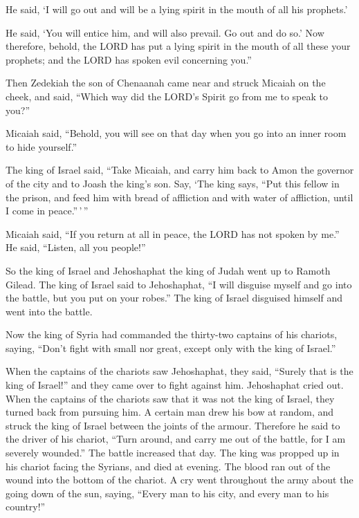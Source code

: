 He said, `I will go out and will be a lying spirit in the mouth of all
his prophets.'

He said, `You will entice him, and will also prevail. Go out and do so.'
 Now therefore, behold, the LORD has put a lying spirit in
the mouth of all these your prophets; and the LORD has spoken evil
concerning you.''

 Then Zedekiah the son of Chenaanah came near and struck
Micaiah on the cheek, and said, ``Which way did the LORD's Spirit go
from me to speak to you?''

 Micaiah said, ``Behold, you will see on that day when you
go into an inner room to hide yourself.''

 The king of Israel said, ``Take Micaiah, and carry him
back to Amon the governor of the city and to Joash the king's son.
 Say, `The king says, ``Put this fellow in the prison, and
feed him with bread of affliction and with water of affliction, until I
come in peace.''\,'\,''

 Micaiah said, ``If you return at all in peace, the LORD
has not spoken by me.'' He said, ``Listen, all you people!''

 So the king of Israel and Jehoshaphat the king of Judah
went up to Ramoth Gilead.  The king of Israel said to
Jehoshaphat, ``I will disguise myself and go into the battle, but you
put on your robes.'' The king of Israel disguised himself and went into
the battle.

 Now the king of Syria had commanded the thirty-two
captains of his chariots, saying, ``Don't fight with small nor great,
except only with the king of Israel.''

 When the captains of the chariots saw Jehoshaphat, they
said, ``Surely that is the king of Israel!'' and they came over to fight
against him. Jehoshaphat cried out.  When the captains of
the chariots saw that it was not the king of Israel, they turned back
from pursuing him.  A certain man drew his bow at random,
and struck the king of Israel between the joints of the armour.
Therefore he said to the driver of his chariot, ``Turn around, and carry
me out of the battle, for I am severely wounded.''  The
battle increased that day. The king was propped up in his chariot facing
the Syrians, and died at evening. The blood ran out of the wound into
the bottom of the chariot.  A cry went throughout the army
about the going down of the sun, saying, ``Every man to his city, and
every man to his country!''

